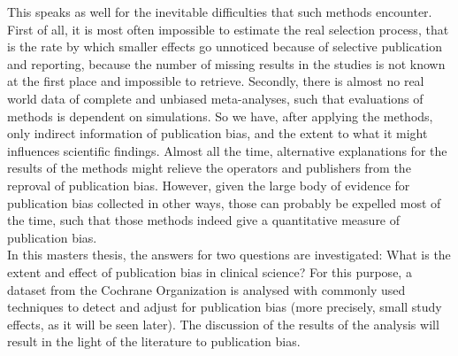 \documentclass[11pt,a4paper,twoside]{book}\usepackage[]{graphicx}\usepackage[]{color}
\begin{document}
This speaks as well for the inevitable difficulties that such methods encounter. First of all, it is most often impossible to estimate the real selection process, that is the rate by which smaller effects go unnoticed because of selective publication and reporting, because the number of missing results in the studies is not known at the first place and impossible to retrieve. Secondly, there is almost no real world data of complete and unbiased meta-analyses, such that evaluations of methods is dependent on simulations. So we have, after applying the methods, only indirect information of publication bias, and the extent to what it might influences scientific findings. Almost all the time, alternative explanations for the results of the methods might relieve the operators and publishers from the reproval of publication bias. However, given the large body of evidence for publication bias collected in other ways, those can probably be expelled most of the time, such that those methods indeed give a quantitative measure of publication bias. \\
In this masters thesis, the answers for two questions are investigated: What is the extent and effect of publication bias in clinical science? For this purpose, a dataset from the Cochrane Organization is analysed with commonly used techniques to detect and adjust for publication bias (more precisely, small study effects, as it will be seen later). The discussion of the results of the analysis will result in the light of the literature to publication bias. 

 
\end{document}
